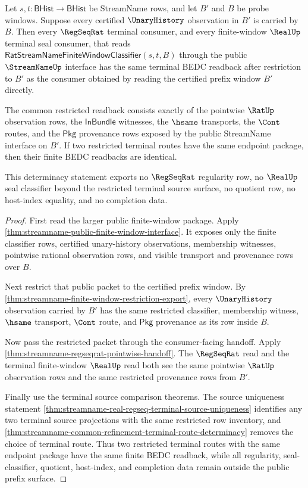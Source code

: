\begin{theorem}
\label{thm:streamname-public-window-prefix-determinacy}
Let $s,t : \mathsf{BHist}\to\mathsf{BHist}$ be StreamName rows, and let $B'$
and $B$ be probe windows. Suppose every certified $\UnaryHistory$ observation
in $B'$ is carried by $B$. Then every $\RegSeqRat$ terminal consumer, and every
finite-window $\RealUp$ terminal seal consumer, that reads
$\mathsf{RatStreamNameFiniteWindowClassifier}(s,t,B)$ through the public
$\StreamNameUp$ interface has the same terminal BEDC readback after restriction
to $B'$ as the consumer obtained by reading the certified prefix window
$B'$ directly.

The common restricted readback consists exactly of the pointwise $\RatUp$
observation rows, the $\mathsf{InBundle}$ witnesses, the $\hsame$ transports,
the $\Cont$ routes, and the $\mathsf{Pkg}$ provenance rows exposed by the
public StreamName interface on $B'$. If two restricted terminal routes have the
same endpoint package, then their finite BEDC readbacks are identical.

This determinacy statement exports no $\RegSeqRat$ regularity row, no
$\RealUp$ seal classifier beyond the restricted terminal source surface, no
quotient row, no host-index equality, and no completion data.
\end{theorem}
\begin{proof}
First read the larger public finite-window package. Apply
\autoref{thm:streamname-public-finite-window-interface}. It exposes only the
finite classifier rows, certified unary-history observations, membership
witnesses, pointwise rational observation rows, and visible transport and
provenance rows over $B$.

Next restrict that public packet to the certified prefix window. By
\autoref{thm:streamname-finite-window-restriction-export}, every
$\UnaryHistory$ observation carried by $B'$ has the same restricted classifier,
membership witness, $\hsame$ transport, $\Cont$ route, and $\mathsf{Pkg}$
provenance as its row inside $B$.

Now pass the restricted packet through the consumer-facing handoff. Apply
\autoref{thm:streamname-regseqrat-pointwise-handoff}. The $\RegSeqRat$ read and
the terminal finite-window $\RealUp$ read both see the same pointwise $\RatUp$
observation rows and the same restricted provenance rows from $B'$.

Finally use the terminal source comparison theorems. The source uniqueness
statement
\autoref{thm:streamname-real-regseq-terminal-source-uniqueness} identifies any
two terminal source projections with the same restricted row inventory, and
\autoref{thm:streamname-common-refinement-terminal-route-determinacy} removes
the choice of terminal route. Thus two restricted terminal routes with the same
endpoint package have the same finite BEDC readback, while all regularity,
seal-classifier, quotient, host-index, and completion data remain outside the
public prefix surface.
\end{proof}

